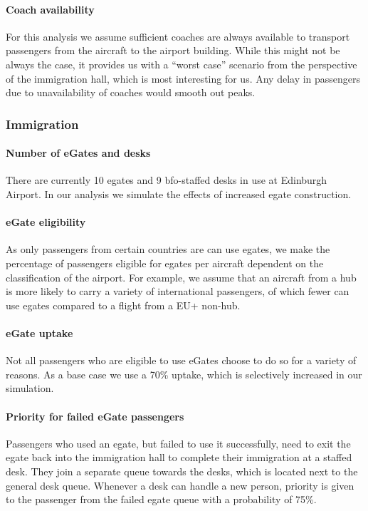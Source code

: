 \documentclass[10pt]{article}
\begin{document}
\paragraph{Coach availability}
For this analysis we assume sufficient coaches are always available to transport passengers from the aircraft to the airport building. While this might not be always the case, it provides us with a ``worst case'' scenario from the perspective of the immigration hall, which is most interesting for us. Any delay in passengers due to unavailability of coaches would smooth out peaks.

\subsubsection{Immigration} \label{subsec:choices_immigration}

\paragraph{Number of eGates and desks} There are currently 10 \glspl{egate} and 9 \gls{bfo}-staffed desks in use at Edinburgh Airport. In our analysis we simulate the effects of increased \gls{egate} construction.



\paragraph{eGate eligibility} 
As only passengers from certain countries are can use \glspl{egate}, we make the percentage of passengers eligible for \glspl{egate} per aircraft dependent on the classification of the airport. For example, we assume that an aircraft from a hub is more likely to carry a variety of international passengers, of which fewer can use \glspl{egate} compared to a flight from a EU+ non-hub. 

\paragraph{eGate uptake} 
Not all passengers who are eligible to use eGates choose to do so for a variety of reasons. As a base case we use a 70\% uptake, which is selectively increased in our simulation. 


\paragraph{Priority for failed eGate passengers}
Passengers who used an \gls{egate}, but failed to use it successfully, need to exit the \gls{egate} back into the immigration hall to complete their immigration at a staffed desk. They join a separate queue towards the desks, which is located next to the general desk queue. Whenever a desk can handle a new person, priority is given to the passenger from the failed \gls{egate} queue with a probability of 75\%.
\end{document}
